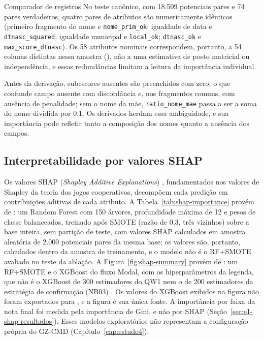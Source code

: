 \begin{chapter}{Comparador de registros}
No teste canônico, com 18.509 potenciais pares e 74 pares verdadeiros, quatro pares de atributos são numericamente idênticos (primeiro fragmento do nome e \texttt{nome\_\allowbreak prim\_\allowbreak ok}; igualdade de data e \texttt{dtnasc\_\allowbreak squared}; igualdade municipal e \texttt{local\_\allowbreak ok}; \texttt{dtnasc\_\allowbreak ok} e \texttt{max\_\allowbreak score\_\allowbreak dtnasc}). Os 58 atributos nominais correspondem, portanto, a 54 colunas distintas nessa amostra (), não a uma estimativa de posto matricial ou independência, e essas redundâncias limitam a leitura da importância individual.

Antes da derivação, subescores ausentes são preenchidos com zero, o que confunde campo ausente com discordância e, nos fragmentos comuns, com ausência de penalidade; sem o nome da mãe, \texttt{ratio\_nome\_mae} passa a ser a soma do nome dividida por 0,1. Os derivados herdam essa ambiguidade, e sua importância pode refletir tanto a composição dos nomes quanto a ausência dos campos.

\subsection{Interpretabilidade por valores SHAP}\label{sec:e1-shap-metodo}

Os valores SHAP (\textit{Shapley Additive Explanations}) \cite{Lundberg2017shap}, fundamentados nos valores de Shapley da teoria dos jogos cooperativos, decompõem cada predição em contribuições aditivas de cada atributo. A Tabela~\ref{tab:shap-importance} provém de : um Random Forest com 150 árvores, profundidade máxima de 12 e pesos de classe balanceados, treinado após SMOTE (razão de 0,3, três vizinhos) sobre a base inteira, sem partição de teste, com valores SHAP calculados em amostra aleatória de 2.000 potenciais pares da mesma base; os valores são, portanto, calculados dentro da amostra de treinamento, e o modelo não é o RF+SMOTE avaliado no teste da ablação. A Figura~\ref{fig:shap-summary} provém de : um RF+SMOTE e o XGBoost do fluxo Modal, com os hiperparâmetros da legenda, que não é o XGBoost de 300 estimadores do QW1 nem o de 200 estimadores da estratégia de confirmação (NB03) \cite{Jardim2026phdrepo}. Os valores do XGBoost exibidos na figura não foram exportados para , e a figura é sua única fonte. A importância por faixa da nota final foi medida pela importância de Gini, e não por SHAP (Seção~\ref{sec:e1-shap-resultados}). Esses modelos exploratórios não representam a configuração própria do GZ-CMD (Capítulo~\ref{cap:estudo4}).


\end{chapter}
